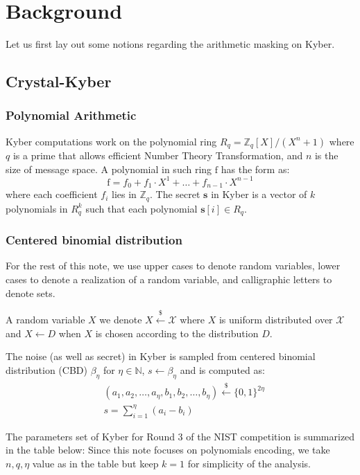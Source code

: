 \documentclass{llncs}
\begin{document}
	\section{Background}\label{sec:bg}
	Let us first lay out some notions regarding the arithmetic masking on Kyber.
	\subsection{Crystal-Kyber}
	\subsubsection{Polynomial Arithmetic}
	Kyber computations work on the polynomial ring $R_q = \mathbb{Z}_q[X]/(X^n + 1)$ where $q$ is a prime that allows efficient Number Theory Transformation, and $n$ is the size of message space. 
	A polynomial in such ring $\text{f}$ has the form as:
	\begin{equation}
		\text{f} = f_0 + f_1\cdot X^1 + \dots + f_{n-1}\cdot X^{n-1}
	\end{equation}
	where each coefficient $f_i$ lies in $\mathbb{Z}_q$.
	The secret $\mathbf{s}$ in Kyber is a vector of $k$ polynomials in $R^k_q$ such that each polynomial $\mathbf{s}[i] \in R_q$.
	
	\subsubsection{Centered binomial distribution}
	
	For the rest of this note, we use upper cases to denote random variables, lower cases to denote a realization of a random variable, and calligraphic letters to denote sets.
	
	A random variable $X$ we denote $X \overset{\$}{\leftarrow} \mathcal{X}$ where $X$ is uniform distributed over $\mathcal{X}$ and $X \leftarrow D$ when $X$ is chosen according to the distribution $D$.
	
	The noise (as well as secret) in Kyber is sampled from centered binomial distribution (CBD) $\beta_{\eta}$ for $\eta \in \mathbb{N}$, $s \leftarrow \beta_{\eta}$ and is computed as:
	\begin{align*}
		&(a_1, a_2, \dots, a_{\eta}, b_1, b_2, \dots, b_{\eta}) \overset{\$}{\leftarrow} \{0, 1\}^{2\eta}\\
		&s = \sum_{i=1}^{\eta}(a_i-b_i)
	\end{align*}
	
	The parameters set of Kyber for Round 3 of the NIST competition is summarized in the table below:
	Since this note focuses on polynomials encoding, we take $n, q, \eta$ value as in the table but keep $k=1$ for simplicity of the analysis.
	
\end{document}
